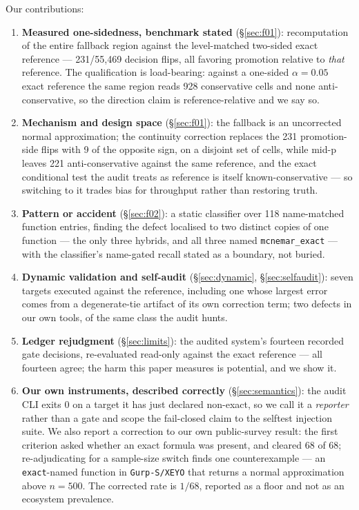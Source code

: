 \documentclass[10pt]{article}
\newcommand{\code}[1]{\texttt{#1}}
\begin{document}
Our contributions:
\begin{enumerate}
  \item \textbf{Measured one-sidedness, benchmark stated} (\S\ref{sec:f01}):
  recomputation of the entire fallback region against the level-matched
  two-sided exact reference --- 231/55{,}469 decision flips, all favoring
  promotion relative to \emph{that} reference. The qualification is load-bearing:
  against a one-sided $\alpha{=}0.05$ exact reference the same region reads
  928 conservative cells and none anti-conservative, so the direction claim is
  reference-relative and we say so.
  \item \textbf{Mechanism and design space} (\S\ref{sec:f01}): the fallback is
  an uncorrected normal approximation; the continuity correction replaces the
  231 promotion-side flips with 9 of the opposite sign, on a disjoint set of
  cells, while mid-p
  leaves 221 anti-conservative against the same reference, and the exact
  conditional test the audit treats
  as reference is itself known-conservative \citep{fagerland2013mcnemar} ---
  so switching to it trades bias for throughput rather than restoring truth.
  \item \textbf{Pattern or accident} (\S\ref{sec:f02}): a static classifier
  over 118 name-matched function entries, finding the defect localised to two
distinct
  copies of one function --- the only three hybrids, and all three named
  \code{mcnemar\_exact} --- with the classifier's name-gated recall stated as
  a boundary, not buried.
  \item \textbf{Dynamic validation and self-audit} (\S\ref{sec:dynamic},
  \S\ref{sec:selfaudit}): seven targets executed against the reference,
  including one whose largest error comes from a degenerate-tie artifact of
  its own correction term; two defects in our own tools, of the same class the
  audit hunts.
  \item \textbf{Ledger rejudgment} (\S\ref{sec:limits}): the audited system's
  fourteen recorded gate decisions, re-evaluated read-only against the exact
  reference --- all fourteen agree; the harm this paper measures is potential,
  and we show it.
  \item \textbf{Our own instruments, described correctly}
  (\S\ref{sec:semantics}): the audit CLI exits $0$ on a target it has just
  declared non-exact, so we call it a \emph{reporter} rather than a gate and
  scope the fail-closed claim to the selftest injection suite. We also report
  a correction to our own public-survey result: the first criterion asked
  whether an exact formula was present, and cleared 68 of 68; re-adjudicating
  for a sample-size switch finds one counterexample --- an
  \code{exact}-named function in \code{Gurp-S/XEYO} that returns a normal
  approximation above $n{=}500$. The corrected rate is $1/68$, reported as a
  floor and not as an ecosystem prevalence.
\end{enumerate}
\end{document}
